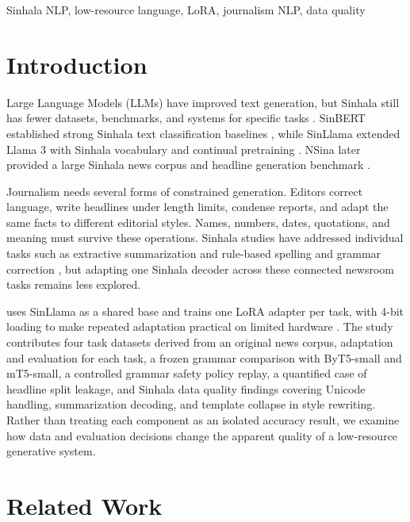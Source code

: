 \documentclass[a4paper,conference]{IEEEtran}
\begin{document}
\begin{IEEEkeywords}
Sinhala NLP, low-resource language, LoRA, journalism NLP, data quality
\end{IEEEkeywords}

\section{Introduction}
Large Language Models (LLMs) have improved text generation, but Sinhala still has
fewer datasets, benchmarks, and systems for specific tasks
\cite{desilva2019survey,jayakody2024performance}. SinBERT established strong
Sinhala text classification baselines \cite{dhananjaya2022bertifying}, while
SinLlama extended Llama 3 with Sinhala vocabulary and continual pretraining
\cite{grattafiori2024llama3,aravinda2025sinllama}. NSina later provided a large
Sinhala news corpus and headline generation benchmark
\cite{hettiarachchi2024nsina}.

Journalism needs several forms of constrained generation. Editors correct
language, write headlines under length limits, condense reports, and adapt the
same facts to different editorial styles. Names, numbers, dates, quotations,
and meaning must survive these operations. Sinhala studies have addressed
individual tasks such as extractive summarization \cite{jahan2023summarization}
and rule-based spelling and grammar correction \cite{goonawardena2022grammar}, but adapting one
Sinhala decoder across these connected newsroom tasks remains less explored.

\systemname{} uses SinLlama as a shared base and trains one LoRA adapter
\cite{hu2022lora} per task, with 4-bit loading to make repeated adaptation
practical on limited hardware \cite{dettmers2023qlora}. The study contributes
four task datasets derived from an original news corpus, adaptation and evaluation for each task, a frozen grammar comparison with ByT5-small and
mT5-small, a controlled grammar safety policy replay, a quantified case of
headline split leakage, and Sinhala data quality findings covering
Unicode handling, summarization decoding, and template collapse in style
rewriting. Rather than treating each component as an isolated accuracy result,
we examine how data and evaluation decisions change the apparent quality of a
low-resource generative system.

\section{Related Work}
\end{document}
